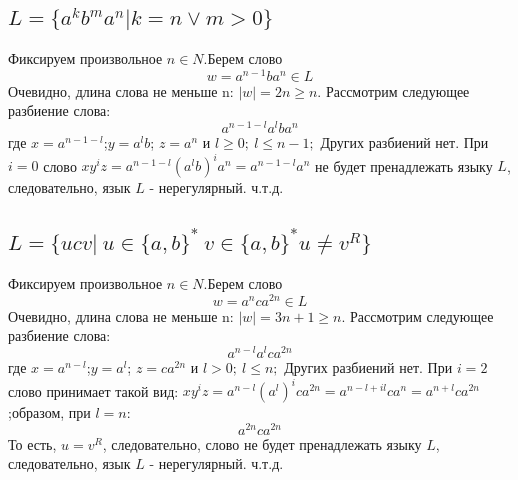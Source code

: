 \documentclass[a4paper,12pt]{article}
\begin{document}
\subsection{$L=\{a^kb^ma^n | k = n\vee m > 0\}$}
Фиксируем произвольное $n\in N$.\newline Берем слово\newline  $$w = a^{n-1}ba^n\in L$$\newline
Очевидно, длина слова не меньше n: $|w|=2n\geq n$.
\newline
Рассмотрим следующее разбиение слова:
$$ a^{n-1-l}a^lba^n$$
где $x=a^{n-1-l}$;\:$y=a^{l}b$;\: $z=a^{n}$ и $l \geq 0;\:l \leq n-1;$\newline
Других разбиений нет.\newline
При $i = 0$ слово $xy^iz = a^{n-1-l}(a^{l}b)^ia^{n} = a^{n-1-l}a^n  $ не будет пренадлежать языку $L$, следовательно, язык  $L$ - нерегулярный.\newline
ч.т.д.
\subsection{$L=\{ucv|\: u \in \{a,b\}^*\:v \in \{a,b\}^* u \neq v^R\}$}
Фиксируем произвольное $n\in N$.\newline Берем слово\newline  $$w =a^nca^{2n}\in L$$\newline
Очевидно, длина слова не меньше n: $|w|=3n+1\geq n$.
\newline
Рассмотрим следующее разбиение слова:
$$ a^{n-l}a^lca^{2n}$$
где $x=a^{n-l}$;\:$y=a^{l}$;\: $z=ca^{2n}$ и $l > 0;\:l \leq n;$\newline
Других разбиений нет.\newline
При $i = 2$ слово принимает такой вид: $xy^iz = a^{n-l}(a^{l})^ica^{2n} = a^{n-l+il}ca^n = a^{n+l}ca^{2n}  $; образом, при $l = n$:\newline
$$a^{2n}ca^{2n}$$То есть, $u = v^R $, следовательно, слово не будет пренадлежать языку $L$, следовательно, язык  $L$ - нерегулярный.\newline
ч.т.д.
\end{document}

